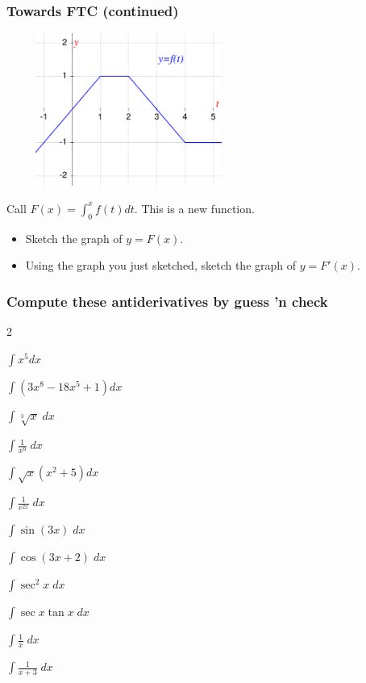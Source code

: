 \documentclass[14pt]{beamer}
\newcommand{\setsize}[1]{\fontsize{#1}{#1}\selectfont} %
\newcommand{\smallerfont}{\setsize{13}} %
\begin{document}
	\begin{frame}[t]
		\smallerfont
		\frametitle{Towards FTC (continued)}

		\begin{center}
			\includegraphics[width=8cm, height=5cm]{G21}
		\end{center}

		Call ${\displaystyle F(x) = \int_0^x f(t) dt}$. This is a new function.
		\begin{itemize}
			\item Sketch the graph of ${\displaystyle y=F(x)}$.

			\item Using the graph you just sketched, sketch the graph of
				${\displaystyle y=F'(x)}$.
		\end{itemize}
	\end{frame}

	\begin{frame}[t]
		\smallerfont
		\frametitle{Compute these antiderivatives by guess 'n check}

		\begin{enumerate}
		\end{enumerate}
	\end{frame}
\end{document}
